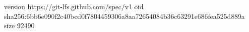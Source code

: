 version https://git-lfs.github.com/spec/v1
oid sha256:6bb6e090f2c40bcd0f7804459306a8aa72654084b36c63291e686fea525d889a
size 92490
